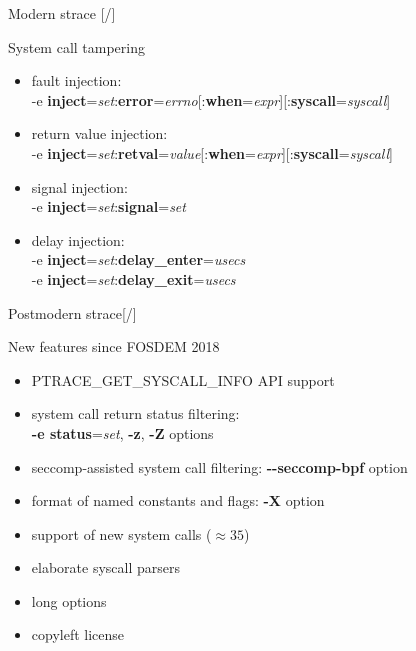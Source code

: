 \documentclass[unicode,aspectratio=169,xcolor={table,dvipsnames,usernames}]{beamer}
\begin{document}
\begin{frame}{Modern strace \hfill [\insertframenumber/\inserttotalframenumber]}
\Large
\begin{block}{System call tampering}
\begin{itemize}
\item fault injection: \\
-e \textbf{inject}=\textit{set}:\textbf{error}=\textit{errno}[:\textbf{when}=\textit{expr}][:\textbf{syscall}=\textit{syscall}]
\item return value injection: \\
-e \textbf{inject}=\textit{set}:\textbf{retval}=\textit{value}[:\textbf{when}=\textit{expr}][:\textbf{syscall}=\textit{syscall}]
\item signal injection: \\
-e \textbf{inject}=\textit{set}:\textbf{signal}=\textit{set}
\item delay injection: \\
-e \textbf{inject}=\textit{set}:\textbf{delay\_enter}=\textit{usecs} \\
-e \textbf{inject}=\textit{set}:\textbf{delay\_exit}=\textit{usecs}
\end{itemize}
\end{block}
\end{frame}

\begin{frame}{Postmodern strace\hfill [\insertframenumber/\inserttotalframenumber]}
\Large
\begin{block}{New features since FOSDEM 2018}
\begin{itemize}
\item PTRACE\_GET\_SYSCALL\_INFO API support
\item system call return status filtering: \\ \textbf{-e status}=\textit{set}, \textbf{-z}, \textbf{-Z} options
\item seccomp-assisted system call filtering: \textbf{-{}-seccomp-bpf} option
\item format of named constants and flags: \textbf{-X} option
\item support of new system calls ($ \approx 35$)
\item elaborate syscall parsers
\item long options
\item copyleft license
\end{itemize}
\end{block}
\end{frame}
\end{document}
